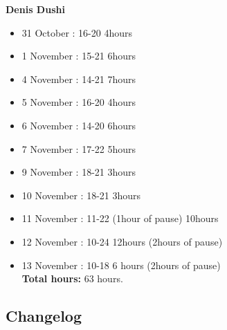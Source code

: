 \textbf{Denis Dushi}
\begin{itemize}
\item 31 October : 16-20  4hours
\item 1 November : 15-21  6hours
\item 4 November : 14-21  7hours
\item 5 November : 16-20  4hours
\item 6 November : 14-20  6hours
\item 7 November : 17-22  5hours
\item 9 November : 18-21  3hours
\item 10 November : 18-21  3hours
\item 11 November : 11-22 (1hour of pause) 10hours
\item 12 November : 10-24  12hours (2hours of pause)
\item 13 November : 10-18 6 hours (2hours of pause) \\

\textbf{Total hours:} 63 hours.
\end{itemize}
\subsection{Changelog}